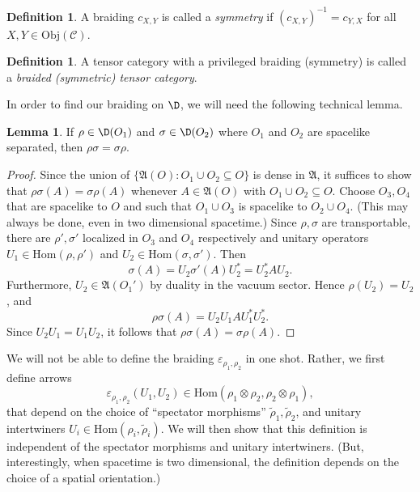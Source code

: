 \documentclass[11pt]{article}
\newcommand{\alg}[1]{\mathfrak{#1}}
\theoremstyle{definition}
\newtheorem{lemma}[thm]{Lemma}
\theoremstyle{definition}
\newtheorem{defn}[thm]{Definition}
\theoremstyle{remark}
\newcommand{\Obj}{\mathrm{Obj}}
\newcommand{\ve}{\varepsilon}
\def\wt#1{{\tilde #1}}
\def\2#1{{\mathcal #1}}
\newcommand{\Hom}{\mathrm{Hom}}
\begin{document}
\begin{defn} A braiding $c_{X,Y}$ is called a \emph{symmetry} if
  $(c_{X,Y})^{-1}=c_{Y,X}$ for all $X,Y\in \Obj (\2C )$. \end{defn}

\begin{defn} A tensor category with a privileged
  braiding (symmetry) is called a \emph{braided
    (symmetric) tensor category}. \end{defn}

In order to find our braiding on $\D$, we will need the following technical lemma.

\begin{lemma} If $\rho \in \D (O_1)$ and $\sigma \in \D (O_2)$ where $O_1$ and $O_2$
  are spacelike separated, then $\rho \sigma =\sigma \rho$.  \label{commute}
\end{lemma}

\begin{proof} Since the union of $\{ \alg{A}(O):O_1\cup
  O_2\subseteq O \}$ is dense in $\alg{A}$, it suffices
  to show that $\rho \sigma (A)=\sigma \rho (A)$
  whenever $A\in \alg{A}(O)$ with $O_1\cup O_2\subseteq
  O$.  Choose $O_3,O_4$ that are spacelike to $O$ and
  such that $O_1\cup O_3$ is spacelike to $O_2\cup
  O_4$.  (This may always be done, even in two
  dimensional spacetime.)  Since $\rho ,\sigma$ are
  transportable, there are $\rho ',\sigma '$ localized
  in $O_3$ and $O_4$ respectively and unitary operators
  $U_1\in \Hom (\rho ,\rho ')$ and $U_2\in \Hom (\sigma
  ,\sigma ')$.  Then
$$ \sigma (A)=U_2\sigma '(A)U_2^*=U_2^*AU_2 .$$
Furthermore, $U_2\in \alg{A}(O_1')$ by duality in the vacuum sector.  Hence $\rho
(U_2)=U_2$, and
$$ \rho \sigma (A)=U_2U_1AU_1^*U_2^* .$$
Since $U_2U_1=U_1U_2$, it follows that $\rho \sigma (A)=\sigma \rho (A)$.
\end{proof}

We will not be able to define the braiding $\ve _{\rho _1,\rho _2}$ in one shot.
Rather, we first define arrows
$$\ve _{\rho _1,\rho _2}(U_1,U_2)\in \Hom (\rho _1\otimes \rho _2,\rho _2\otimes \rho
_1) ,$$ that depend on the choice of ``spectator morphisms'' $\wt \rho _1,\wt \rho
_2$, and unitary intertwiners $U_i\in \Hom (\rho _i,\wt \rho _i )$.  We will then
show that this definition is independent of the spectator morphisms and unitary
intertwiners.  (But, interestingly, when spacetime is two dimensional, the definition
depends on the choice of a spatial orientation.)
\end{document}
